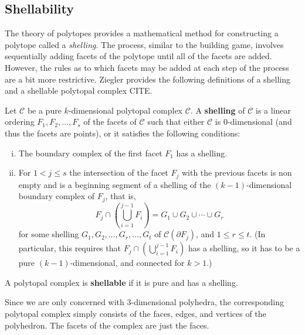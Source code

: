 \subsection{Shellability}
The theory of polytopes provides a mathematical method for constructing a polytope called a \textit{shelling}. The process, similar to the building game, involves sequentially adding facets of the polytope until all of the facets are added. However, the rules as to which facets may be added at each step of the process are a bit more restrictive. Ziegler provides the following definitions of a shelling and a shellable polytopal complex CITE. 
\begin{mydef}
\label{def:shelling}
Let $\mathcal{C}$ be a pure $k$-dimensional polytopal complex $\mathcal{C}$. A \textbf{shelling} of $\mathcal{C}$ is a linear ordering $F_1,F_2,\dots,F_s$ of the facets of $\mathcal{C}$ such that either $\mathcal{C}$ is $0$-dimensional (and thus the facets are points), or it satisfies the following conditions:
\begin{enumerate}[(i)]
\item The boundary complex of the first facet $F_1$ has a shelling.
\item For $1 < j \leq s$ the intersection of the facet $F_j$ with the previous facets is non empty and is a beginning segment of a shelling of the $(k-1)$-dimensional boundary complex of $F_j$, that is,
$$F_j \cap \left(\bigcup_{i=1}^{j-1}F_i\right) = G_1 \cup G_2 \cup \cdots \cup G_r$$
for some shelling $G_1, G_2, \dots, G_r, \dots, G_t$ of $\mathcal{C}(\partial F_j)$, and $1 \leq r \leq t$. (In particular, this requires that $F_j \cap (\bigcup_{i=1}^{j-1} F_i)$ has a shelling, so it has to be a pure $(k-1)$-dimensional, and connected for $k > 1$.)
\end{enumerate} 
\end{mydef}

\begin{mydef}
A polytopal complex is \textbf{shellable} if it is pure and has a shelling. 
\end{mydef}

Since we are only concerned with $3$-dimensional polyhedra, the corresponding polytopal complex simply consists of the faces, edges, and vertices of the polyhedron. The facets of the complex are just the faces.



